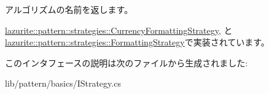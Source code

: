 アルゴリズムの名前を返します。 

\hyperlink{classlazurite_1_1pattern_1_1strategies_1_1_currency_formatting_strategy_a507841259b13c733d09c2f747e81b8d5}{lazurite::pattern::strategies::CurrencyFormattingStrategy}, と \hyperlink{classlazurite_1_1pattern_1_1strategies_1_1_formatting_strategy_a038a894580ec88e41ae22efead88c6e9}{lazurite::pattern::strategies::FormattingStrategy}で実装されています。

このインタフェースの説明は次のファイルから生成されました:\begin{DoxyCompactItemize}
\item 
lib/pattern/basics/IStrategy.cs\end{DoxyCompactItemize}
